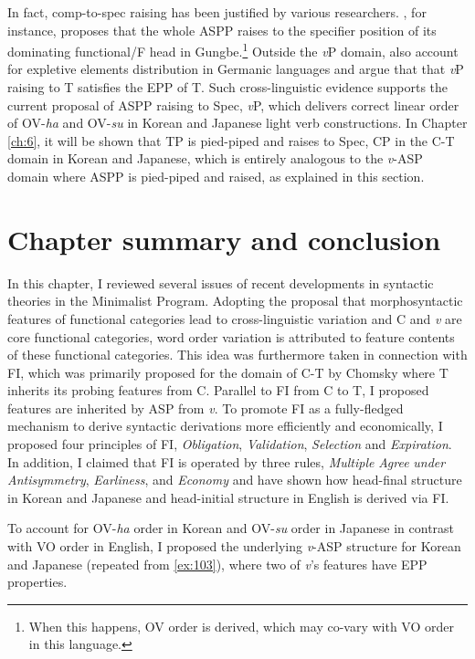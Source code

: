 In fact, comp-to-spec raising has been justified by various researchers. \citet{Aboh2004}, for instance, proposes that the whole \ac{ASP}P raises to the specifier position of its dominating functional/F head in Gungbe.\footnote{When this happens, \ac{OV} order is derived, which may co-vary with \ac{VO} order in this language. } Outside the \textit{v}P domain, \citet{RichardsBiberauer2005} also account for expletive elements distribution in Germanic languages and argue that that \textit{v}P raising to T satisfies the \ac{EPP} of T. Such cross-linguistic evidence supports the current proposal of \ac{ASP}P raising to Spec, \textit{v}P, which delivers correct linear order of \ac{OV}-\textit{ha} and \ac{OV}-\textit{su} in Korean and Japanese light verb constructions. In Chapter \ref{ch:6}, it will be shown that \ac{TP} is pied-piped and raises to Spec, \ac{CP} in the C-T domain in Korean and Japanese, which is entirely analogous to the \textit{v}-\ac{ASP} domain where \ac{ASP}P is pied-piped and raised, as explained in this section. 

\section{Chapter summary and conclusion}\label{ch4:section:4.5} 

In this chapter, I reviewed several issues of recent developments in syntactic theories in the Minimalist Program. Adopting the proposal that morphosyntactic features of functional categories lead to cross-linguistic variation and C and \textit{v} are core functional categories, word order variation is attributed to feature contents of these functional categories. This idea was furthermore taken in connection with \ac{FI}, which was primarily proposed for the domain of C-T by Chomsky where T inherits its probing features from C. Parallel to \ac{FI} from C to T, I proposed features are inherited by \ac{ASP} from \textit{v}. To promote \ac{FI} as a fully-fledged mechanism to derive syntactic derivations more efficiently and economically, I proposed four principles of \ac{FI}, \textit{Obligation}, \textit{Validation}, \textit{Selection} and \textit{Expiration}. In addition, I claimed that \ac{FI} is operated by three rules, \textit{Multiple} \textit{Agree} \textit{under} \textit{Antisymmetry}, \textit{Earliness}, and \textit{Economy} and have shown how head-final structure in Korean and Japanese and head-initial structure in English is derived via \ac{FI}.

To account for \ac{OV}-\textit{ha} order in Korean and \ac{OV}-\textit{su} order in Japanese in contrast with \ac{VO} order in English, I proposed the underlying \textit{v}-\ac{ASP} structure for Korean and Japanese  (repeated from \ref{ex:103}), where two of \textit{v}’s features have \ac{EPP} properties. 

